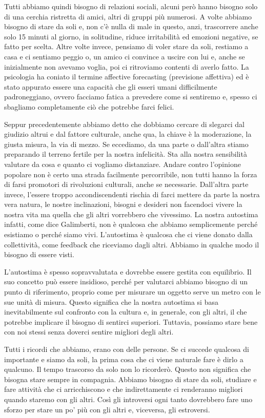 \documentclass[12pt]{book} %
\begin{document}
Tutti abbiamo quindi bisogno di relazioni sociali, alcuni però hanno bisogno solo di una cerchia ristretta di amici,
altri di gruppi più numerosi. A volte abbiamo bisogno di stare da
soli e, non c'è nulla di male in questo, anzi, trascorrere anche solo
15 minuti al giorno, in solitudine, riduce irritabilità ed emozioni negative, se fatto per scelta. Altre volte invece,
pensiamo di voler stare da soli, restiamo a casa e ci sentiamo peggio o, un amico ci convince a uscire con lui e, anche
se inizialmente non avevamo voglia, poi ci ritroviamo contenti di averlo fatto. La psicologia ha coniato il termine affective
forecasting (previsione affettiva) ed è stato appurato essere una capacità che gli esseri umani difficilmente
padroneggiano, ovvero facciamo fatica a prevedere come si sentiremo e, spesso ci sbagliamo completamente ciò che
potrebbe farci felici.

Seppur precedentemente abbiamo detto che dobbiamo cercare di slegarci dal giudizio altrui e dal fattore culturale, anche
qua, la chiave è la moderazione, la giusta misura, la via di mezzo. Se eccediamo, da una parte o
dall'altra stiamo preparando il terreno fertile per la nostra infelicità. Sta alla nostra
sensibilità valutare da cosa e quanto ci vogliamo distanziare. Andare contro l'opinione popolare non è
certo una strada facilmente percorribile, non tutti hanno la forza di farsi promotori di rivoluzioni culturali, anche
se necessarie. Dall'altra parte invece, l'essere troppo accondiscendenti
rischia di farci mettere da parte la nostra vera natura, le nostre inclinazioni, bisogni e desideri non facendoci
vivere la nostra vita ma quella che gli altri vorrebbero che vivessimo. La nostra autostima infatti, come dice
Galimberti, non è qualcosa che abbiamo semplicemente perché esistiamo o perché siamo vivi.
L'autostima è qualcosa che ci viene donato dalla collettività, come feedback che riceviamo dagli
altri. Abbiamo in qualche modo il bisogno di essere visti.

L'autostima è spesso sopravvalutata e dovrebbe essere gestita con equilibrio. Il suo concetto può essere insidioso, perché per valutarci abbiamo bisogno di un punto di riferimento, proprio come per misurare un oggetto serve un metro con le sue unità di misura. Questo significa che la nostra autostima si basa inevitabilmente sul confronto con la cultura e, in generale, con gli altri, il che potrebbe implicare il bisogno di sentirci superiori.
Tuttavia, possiamo stare bene con noi stessi senza doverci sentire migliori degli altri.

Tutti i ricordi che abbiamo, erano con delle persone. Se ci succede qualcosa di importante e siamo da soli, la prima cosa che ci viene naturale fare è dirlo a qualcuno. Il tempo trascorso da solo non lo ricorderò. Questo non significa che bisogna stare sempre in compagnia. Abbiamo bisogno di stare da soli, studiare e fare attività che ci arricchiscono e che indirettamente ci renderanno migliori quando staremo con gli altri. Così gli introversi ogni tanto dovrebbero fare uno sforzo per stare  un po' più con gli altri e, viceversa, gli estroversi.
\end{document}
